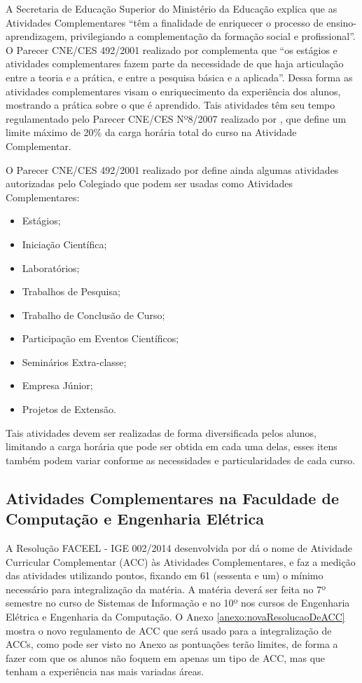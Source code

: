 A Secretaria de Educação Superior do Ministério da Educação \cite{min_educ_perguntas} explica que as Atividades Complementares “têm a finalidade de enriquecer o processo de ensino-aprendizagem, privilegiando a complementação da formação social e profissional”. O Parecer CNE/CES 492/2001 realizado por \cite{parecer_492_2001} complementa que “os estágios e atividades complementares fazem parte da necessidade de que haja articulação entre a teoria e a prática, e entre a pesquisa básica e a aplicada”. Dessa forma as atividades complementares visam o enriquecimento da experiência dos alunos, mostrando a prática sobre o que é aprendido. Tais atividades têm seu tempo regulamentado pelo Parecer CNE/CES Nº8/2007 realizado por \cite{parecer_8_2007}, que define um limite máximo de 20\% da carga horária total do curso na Atividade Complementar.

O Parecer CNE/CES 492/2001 realizado por \cite{parecer_492_2001} define ainda algumas atividades autorizadas pelo Colegiado que podem ser usadas como Atividades Complementares:

\begin{itemize}
    \item Estágios;
    \item Iniciação Científica;
    \item Laboratórios;
    \item Trabalhos de Pesquisa;
    \item Trabalho de Conclusão de Curso;
    \item Participação em Eventos Científicos;
    \item Seminários Extra-classe;
    \item Empresa Júnior;
    \item Projetos de Extensão.
\end{itemize}

Tais atividades devem ser realizadas de forma diversificada pelos alunos, limitando a carga horária que pode ser obtida em cada uma delas, esses itens também podem variar conforme as necessidades e particularidades de cada curso.

\subsection{Atividades Complementares na Faculdade de Computação e Engenharia Elétrica}

A Resolução FACEEL - IGE 002/2014 desenvolvida por \cite{faceel2014regulamento} dá o nome de Atividade Curricular Complementar (ACC) às Atividades Complementares, e faz a medição das atividades utilizando pontos, fixando em 61 (sessenta e um) o mínimo necessário para integralização da matéria. A matéria deverá ser feita no 7º semestre no curso de Sistemas de Informação e no 10º nos cursos de Engenharia Elétrica e Engenharia da Computação. O Anexo \ref{anexo:novaResolucaoDeACC} mostra o novo regulamento de ACC que será usado para a integralização de ACCs, como pode ser visto no Anexo as pontuações terão limites, de forma a fazer com que os alunos não foquem em apenas um tipo de ACC, mas que tenham a experiência nas mais variadas áreas.

